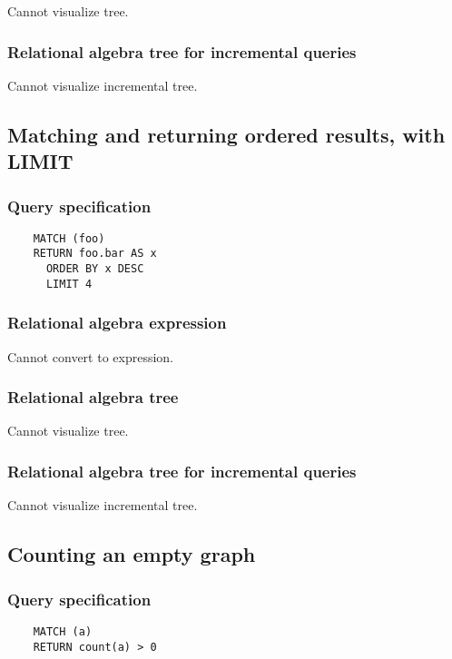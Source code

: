 	Cannot visualize tree.

	\subsubsection*{Relational algebra tree for incremental queries}

	Cannot visualize incremental tree.
	\subsection{Matching and returning ordered results, with LIMIT}

	\subsubsection*{Query specification}

	\begin{lstlisting}
	MATCH (foo)
	RETURN foo.bar AS x
	  ORDER BY x DESC
	  LIMIT 4
	\end{lstlisting}


	\subsubsection*{Relational algebra expression}

	Cannot convert to expression.

	\subsubsection*{Relational algebra tree}

	Cannot visualize tree.

	\subsubsection*{Relational algebra tree for incremental queries}

	Cannot visualize incremental tree.
	\subsection{Counting an empty graph}

	\subsubsection*{Query specification}

	\begin{lstlisting}
	MATCH (a)
	RETURN count(a) > 0
	\end{lstlisting}


